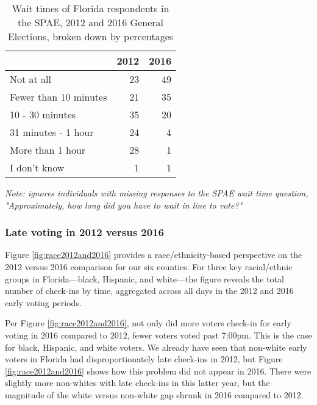 \documentclass[12pt,titlepage]{article}
\begin{document}
\begin{table}[ht]
\centering
\caption{Wait times of Florida respondents in the SPAE, 2012 and 2016
  General Elections, broken down by percentages} 
\label{tab:floridaspae}
\begin{tabular}{lrr}
  \hline
 & 2012 & 2016 \\ 
  \hline
  Not at all &  23 &  49 \\ 
  Fewer than 10 minutes &  21 &  35 \\ 
  10 - 30 minutes &  35 &  20 \\ 
  31 minutes - 1 hour &  24 &   4 \\ 
  More than 1 hour &  28 &   1 \\ 
  I don't know &   1 &   1 \\ 
   \hline
\end{tabular}
\begin{flushleft}
  \emph{Note: ignores individuals with missing responses to the SPAE
    wait time question, "Approximately, how long did you have to wait
    in line to vote?"}
\end{flushleft}
\end{table}

% 

\subsubsection*{Late voting in 2012 versus 2016}

Figure \ref{fig:race2012and2016} provides a race/ethnicity-based
perspective on the 2012 versus 2016 comparison for our six counties.
For three key racial/ethnic groups in Florida---black, Hispanic, and
white---the figure reveals the total number of check-ins by time,
aggregated across all days in the 2012 and 2016 early voting periods.

Per Figure \ref{fig:race2012and2016}, not only did more voters
check-in for early voting in 2016 compared to 2012, fewer voters voted
past 7:00pm.  This is the case for black, Hispanic, and white voters.
We already have seen that non-white early voters in Florida had
disproportionately late check-ins in 2012, but Figure
\ref{fig:race2012and2016} shows how this problem did not appear in
2016.  There were slightly more non-whites with late check-ins in this
latter year, but the magnitude of the white versus non-white gap
shrunk in 2016 compared to 2012.
\end{document}
